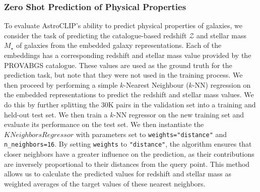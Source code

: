 \documentclass[a4paper,12pt]{article}
\begin{document}
\subsubsection*{Zero Shot Prediction of Physical Properties}
To evaluate AstroCLIP's ability to predict physical properties of galaxies, we consider the task of predicting the catalogue-based redshift $\mathcal{Z}$ and stellar mass $M_{\star}$ of galaxies from the embedded galaxy representations. Each of the embeddings has a corresponding redshift and stellar mass value provided by the PROVABGS catalogue. These values are used as the ground truth for the prediction task, but note that they were not used in the training process. We then proceed by performing a simple $k$-Nearest Neighbour ($k$-NN) regression on the embedded representations to predict the redshift and stellar mass values. 
We do this by further splitting the 30K pairs in the validation set into a training and held-out test set. We then train a $k$-NN regressor on the new training set and evaluate its performance on the test set. We then instantiate the $KNeighborsRegressor$ with parameters set to \texttt{weights="distance"} and \texttt{n\_neighbors=16}. By setting \texttt{weights} to \texttt{"distance"}, the algorithm ensures that closer neighbors have a greater influence on the prediction, as their contributions are inversely proportional to their distances from the query point. This method allows us to calculate the predicted values for redshift and stellar mass as weighted averages of the target values of these nearest neighbors. 
\end{document}

